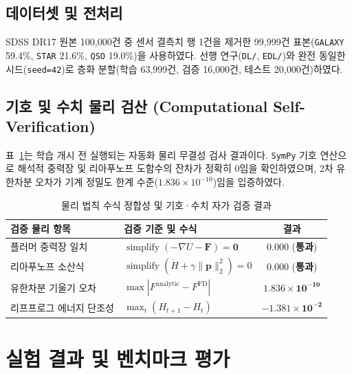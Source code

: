 \documentclass[journal]{IEEEtran}
\begin{document}
\subsection{데이터셋 및 전처리}
SDSS DR17 원본 100,000건 중 센서 결측치 행 1건을 제거한 99,999건 표본(\texttt{GALAXY} 59.4\%, \texttt{STAR} 21.6\%, \texttt{QSO} 19.0\%)을 사용하였다. 선행 연구(\texttt{DL/}, \texttt{EDL/})와 완전 동일한 시드(\texttt{seed=42})로 층화 분할(학습 63,999건, 검증 16,000건, 테스트 20,000건)하였다.

\subsection{기호 및 수치 물리 검산 (Computational Self-Verification)}
표~\ref{tab:verification_stats}는 학습 개시 전 실행되는 자동화 물리 무결성 검사 결과이다. \texttt{SymPy} 기호 연산으로 해석적 중력장 및 리아푸노프 도함수의 잔차가 정확히 $0$임을 확인하였으며, 2차 유한차분 오차가 기계 정밀도 한계 수준($1.836 \times 10^{-10}$)임을 입증하였다.

\begin{table}[!h]
\centering
\caption{물리 법칙 수식 정합성 및 기호·수치 자가 검증 결과}
\label{tab:verification_stats}
\footnotesize
\setlength{\tabcolsep}{2pt}
\begin{tabular}{l l c}
\toprule
\textbf{검증 물리 항목} & \textbf{검증 기준 및 수식} & \textbf{결과} \\
\midrule
플러머 중력장 일치 & $\operatorname{simplify}(-\nabla U - \mathbf{F}) = \mathbf{0}$ & $\mathbf{0.000}$ (\textbf{통과}) \\
리아푸노프 소산식 & $\operatorname{simplify}(\dot{H} + \gamma\|\mathbf{p}\|_2^2) = 0$ & $\mathbf{0.000}$ (\textbf{통과}) \\
유한차분 기울기 오차 & $\max |F^{\text{analytic}} - F^{\text{FD}}|$ & $\mathbf{1.836 \times 10^{-10}}$ \\
리프프로그 에너지 단조성 & $\max_t (H_{t+1} - H_t)$ & $\mathbf{-1.381 \times 10^{-2}}$ \\
\bottomrule
\end{tabular}
\end{table}

\section{실험 결과 및 벤치마크 평가}
\end{document}
